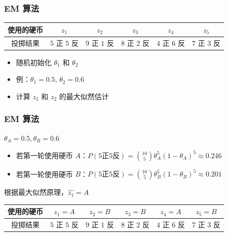 \documentclass{beamer}
\newcommand{\Gh}{\theta}
\begin{document}
\begin{frame}
    \frametitle{EM 算法}

    \begin{table}
        \begin{tabular}{c|c|c|c|c|c}
            使用的硬币 & $z_1$ & $z_2$ & $z_3$ & $z_4$ & $z_5$ \\\hline
            投掷结果 & $5$ 正 $5$ 反 & $9$ 正 $1$ 反 & $8$ 正 $2$ 反 & $4$ 正 $6$ 反 & $7$ 正 $3$ 反
        \end{tabular}
    \end{table}

    \begin{itemize}
        \item 随机初始化 $\Gh_1$ 和 $\Gh_2$
        \item 例：$\Gh_1 = 0.5$, $\Gh_2 = 0.6$
        \item 计算 $z_1$ 和 $z_2$ 的最大似然估计
    \end{itemize}

\end{frame}

\begin{frame}
    \frametitle{EM 算法}

    $\Gh_A = 0.5, \Gh_B = 0.6$

    \begin{itemize}
        \item 若第一轮使用硬币 $A$：$P(5 \text{正} 5 \text{反}) = {10 \choose 5}\Gh_A^{5}(1 - \Gh_A)^{5} \approx 0.246$
        \item 若第一轮使用硬币 $B$：$P(5 \text{正} 5 \text{反}) = {10 \choose 5}\Gh_B^{5}(1 - \Gh_B)^{5} \approx 0.201$
    \end{itemize}

    根据最大似然原理，$\hat{z_1} = A$

    \begin{table}
        \begin{tabular}{c|c|c|c|c|c}
            使用的硬币 & $z_1 = A$ & $z_2 = B$ & $z_3 = B$ & $z_4 = A$ & $z_5 = B$ \\\hline
            投掷结果 & $5$ 正 $5$ 反 & $9$ 正 $1$ 反 & $8$ 正 $2$ 反 & $4$ 正 $6$ 反 & $7$ 正 $3$ 反
        \end{tabular}
    \end{table}

\end{frame}
\end{document}
